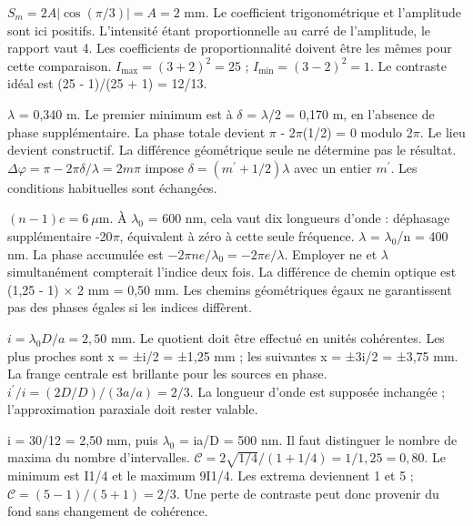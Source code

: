 $S_m=2A|\cos(\pi/3)|=A=2$ mm. Le coefficient trigonométrique et l’amplitude sont ici positifs.
L’intensité étant proportionnelle au carré de l’amplitude, le rapport vaut 4. Les coefficients de proportionnalité doivent être les mêmes pour cette comparaison.
$I_{\max}=(3+2)^2=25$ ; $I_{\min}=(3-2)^2=1$. Le contraste idéal est (25 - 1)/(25 + 1) = 12/13.


\ensuremath{\lambda} = 0,340 m. Le premier minimum est à \ensuremath{\delta} = \ensuremath{\lambda}/2 = 0,170 m, en l’absence de phase supplémentaire.
La phase totale devient \ensuremath{\pi} - 2\ensuremath{\pi}(1/2) = 0 modulo 2\ensuremath{\pi}. Le lieu devient constructif. La différence géométrique seule ne détermine pas le résultat.
$\Delta\varphi=\pi-2\pi\delta/\lambda=2m\pi$ impose $\delta=(m^{\prime}+1/2)\lambda$ avec un entier $m^{\prime}$. Les conditions habituelles sont échangées.


$(n-1)e=6\ \mu$m. À \ensuremath{\lambda_0} = 600 nm, cela vaut dix longueurs d’onde : déphasage supplémentaire -20\ensuremath{\pi}, équivalent à zéro à cette seule fréquence.
\ensuremath{\lambda} = \ensuremath{\lambda_0}/n = 400 nm. La phase accumulée est $-2\pi ne/\lambda_0=-2\pi e/\lambda$. Employer ne et \ensuremath{\lambda} simultanément compterait l’indice deux fois.
La différence de chemin optique est (1,25 - 1) × 2 mm = 0,50 mm. Les chemins géométriques égaux ne garantissent pas des phases égales si les indices diffèrent.


$i=\lambda_0D/a=2{,}50$ mm. Le quotient doit être effectué en unités cohérentes.
Les plus proches sont x = ±i/2 = ±1,25 mm ; les suivantes x = ±3i/2 = ±3,75 mm. La frange centrale est brillante pour les sources en phase.
$i^{\prime}/i=(2D/D)/(3a/a)=2/3$. La longueur d’onde est supposée inchangée ; l’approximation paraxiale doit rester valable.


i = 30/12 = 2,50 mm, puis \ensuremath{\lambda_0} = ia/D = 500 nm. Il faut distinguer le nombre de maxima du nombre d’intervalles.
$\mathcal C=2\sqrt{1/4}/(1+1/4)=1/1{,}25=0{,}80$. Le minimum est I1/4 et le maximum 9I1/4.
Les extrema deviennent 1 et 5 ; $\mathcal C=(5-1)/(5+1)=2/3$. Une perte de contraste peut donc provenir du fond sans changement de cohérence.


